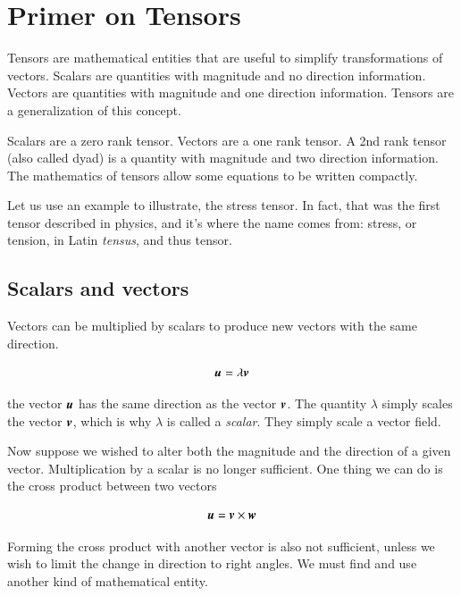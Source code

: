 \chapter{Primer on Tensors}



Tensors are mathematical entities that are useful to simplify transformations of vectors. Scalars are quantities with magnitude and no direction information. Vectors are quantities with magnitude and one direction information. Tensors are a generalization of this concept. 

Scalars are a zero rank tensor. Vectors are a one rank tensor. A 2nd rank tensor (also called dyad) is a quantity with magnitude and two direction information. The mathematics of tensors allow some equations to be written compactly. 


Let us use an example to illustrate, the stress tensor. In fact, that
was the first tensor described in physics, and it's where the name
comes from: stress, or tension, in Latin {\it tensus}, and thus
tensor.

\section{Scalars and vectors}

Vectors can be multiplied by scalars to produce new vectors with the same  direction.

\begin{equation}
{\boldsymbol{u}} = \lambda {\boldsymbol{v}}
\end{equation}

\noindent the vector ${\boldsymbol{u}}$ has the same direction as the vector
${\boldsymbol{v}}$. The quantity $\lambda$ simply scales the vector
${\boldsymbol{v}}$, which is why $\lambda$ is called a {\it scalar}. They simply scale a vector field. 


Now suppose we wished to alter both the magnitude and the direction of a given vector. Multiplication by a scalar is no longer sufficient. One thing we can do is the cross product between two vectors 

\begin{equation}
{\boldsymbol{u}} =  {\boldsymbol{v}}\times{\boldsymbol{w}}
\end{equation}

Forming the cross product with another vector is also not sufficient, unless we wish to limit the change in direction to right angles. We must find and use another kind of mathematical entity.


